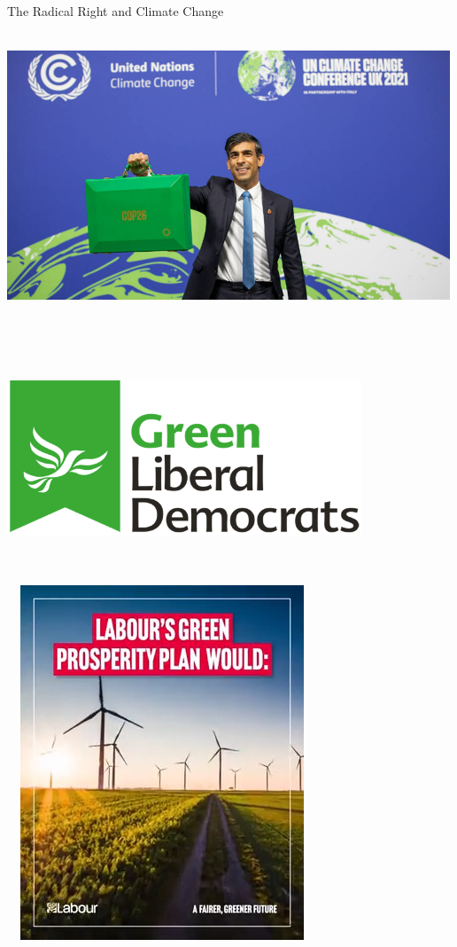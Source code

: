 \documentclass[
  ignorenonframetext,
]{beamer}
\begin{document}
\begin{frame}
\begin{block}{The Radical Right and Climate Change}
\label{the-radical-right-and-climate-change}
\includegraphics[width=5.20833in,height=3.64583in]{images/rishi_green.png}

\includegraphics[width=4.16667in,height=2.60417in]{images/green_libdems.png}

\includegraphics[width=3.64583in,height=4.16667in]{images/labour_prosperity.png}


\end{block}
\end{frame}
\end{document}
